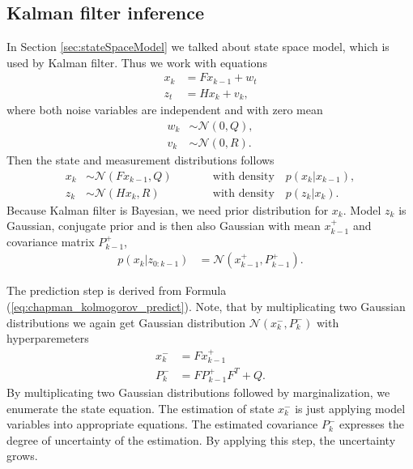 \subsection{Kalman filter inference}
In Section \ref{sec:stateSpaceModel} we talked about state space model, which is used by Kalman filter. Thus we work
with equations
\begin{align}
    x_k &= Fx_{k-1} + w_t \\
    z_t &= Hx_k + v_k,
\end{align}
where both noise variables are independent and with zero mean
\begin{align}
    w_k &\sim \mathcal{N}(0,Q), \\
    v_k &\sim \mathcal{N}(0,R).
\end{align}
Then the state and measurement distributions follows
\begin{align}
    x_k &\sim \mathcal{N}(Fx_{k-1},Q) \qquad && \text{with density}\quad p(x_k|x_{k-1}), \\
    z_k &\sim  \mathcal{N}(Hx_k,R) \qquad && \text{with density}\quad p(z_k|x_k).
\end{align}
Because Kalman filter is Bayesian, we need prior distribution for $x_k$. Model $z_k$ is Gaussian, conjugate prior and
is then also Gaussian with mean $x_{k-1}^+$ and covariance matrix $P_{k-1}^+$,
\begin{align}
    p(x_k|z_{0:k-1}) &= \mathcal{N}(x_{k-1}^+,P_{k-1}^+).
\end{align}

The prediction step is derived from Formula (\ref{eq:chapman_kolmogorov_predict}). Note, that by multiplicating two
Gaussian distributions we again get Gaussian distribution $\mathcal{N}(x_k^-,P_k^-)$ with hyperparemeters
\begin{align}
    x_k^- &= Fx_{k-1}^+ \\
    P_k^- &= FP_{k-1}^{+}F^T + Q.
\end{align}
By multiplicating two Gaussian distributions followed by marginalization, we enumerate the state equation. The
estimation
of state $x_k^-$ is just applying model variables into appropriate equations. The estimated covariance $P_k^-$
expresses the degree of uncertainty of the estimation. By applying this step, the uncertainty grows.

